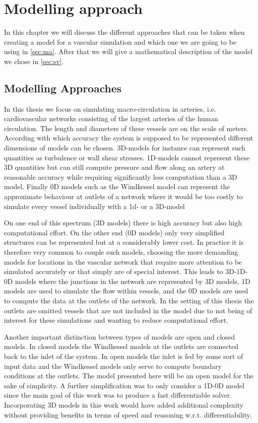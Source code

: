 \documentclass[a4paper, oneside]{discothesis}
\begin{document}
\chapter{Modelling approach} \label{chap:1dm}
In this chapter we will discuss the different approaches that can be taken when creating a model for a vascular simulation and which one we are going to be using in \autoref{sec:ma}.
After that we will give a mathematical description of the model we chose in \autoref{sec:sv}.

\section{Modelling Approaches} \label{sec:ma}
In this thesis we focus on simulating macro-circulation in arteries, i.e. cardiovascular networks consisting of the largest arteries of the human circulation.
The length and diameters of these vessels are on the scale of meters.
According with which accuracy the system is supposed to be represented different dimensions of models can be chosen.
3D-models for instance can represent such quantities as turbulence or wall shear stresses.
1D-models cannot represent these 3D quantities but can still compute pressure and flow along an artery at reasonable accuracy while requiring significantly less computation than a 3D model.
Finally 0D models such as the Windkessel model can represent the approximate behaviour at outlets of a network where it would be too costly to simulate every vessel individually with a 1d- or a 3D-model

On one end of this spectrum (3D models) there is high accuracy but also high computational effort.
On the other end (0D models) only very simplified structures can be represented but at a considerably lower cost.
In practice it is therefore very common to couple such models, choosing the more demanding models for locations in the vascular network that require more attention to be simulated accurately or that simply are of special interest.
This leads to 3D-1D-0D models where the junctions in the network are represented by 3D models, 1D models are used to simulate the flow within vessels, and the 0D models are used to compute the data at the outlets of the network.
In the setting of this thesis the outlets are omitted vessels that are not included in the model due to not being of interest for these simulations and wanting to reduce computational effort.

Another important distinction between types of models are open and closed models.
In closed models the Windkessel models at the outlets are connected back to the inlet of the system.
In open models the inlet is fed by some sort of input data and the Windkessel models only serve to compute boundary conditions at the outlets.
The model presented here will be an open model for the sake of simplicity.
A further simplification was to only consider a 1D-0D model since the main goal of this work was to produce a fast differentiable solver.
Incorporating 3D models in this work would have added additional complexity without providing benefits in terms of speed and reasoning w.r.t. differentiability. \cite{köppl2023dimension}
\end{document}
